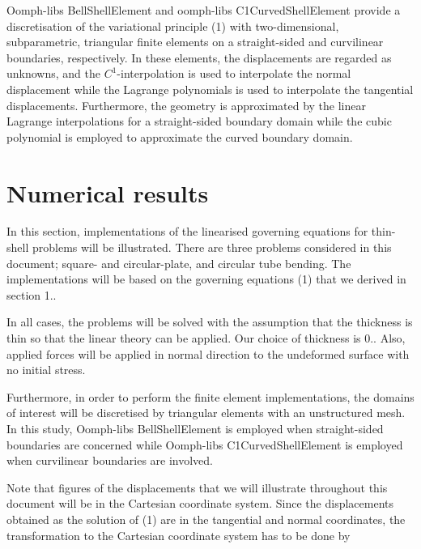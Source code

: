 {\ttfamily Oomph-\/lib\textquotesingle{}s} {\ttfamily Bell\+Shell\+Element} and {\ttfamily oomph-\/lib\textquotesingle{}s} {\ttfamily C1\+Curved\+Shell\+Element} provide a discretisation of the variational principle (1) with two-\/dimensional, subparametric, triangular finite elements on a straight-\/sided and curvilinear boundaries, respectively. In these elements, the displacements are regarded as unknowns, and the $ C^1 $-\/interpolation is used to interpolate the normal displacement while the Lagrange polynomials is used to interpolate the tangential displacements. Furthermore, the geometry is approximated by the linear Lagrange interpolations for a straight-\/sided boundary domain while the cubic polynomial is employed to approximate the curved boundary domain.



 

\hypertarget{index_reslt}{}\section{Numerical results}\label{index_reslt}
In this section, implementations of the linearised governing equations for thin-\/shell problems will be illustrated. There are three problems considered in this document; square-\/ and circular-\/plate, and circular tube bending. The implementations will be based on the governing equations (1) that we derived in section 1..

In all cases, the problems will be solved with the assumption that the thickness is thin so that the linear theory can be applied. Our choice of thickness is 0.. Also, applied forces will be applied in normal direction to the undeformed surface with no initial stress.

Furthermore, in order to perform the finite element implementations, the domains of interest will be discretised by triangular elements with an unstructured mesh. In this study, {\ttfamily Oomph-\/lib\textquotesingle{}s} {\ttfamily Bell\+Shell\+Element} is employed when straight-\/sided boundaries are concerned while {\ttfamily Oomph-\/lib\textquotesingle{}s} {\ttfamily C1\+Curved\+Shell\+Element} is employed when curvilinear boundaries are involved.

Note that figures of the displacements that we will illustrate throughout this document will be in the Cartesian coordinate system. Since the displacements obtained as the solution of (1) are in the tangential and normal coordinates, the transformation to the Cartesian coordinate system has to be done by

